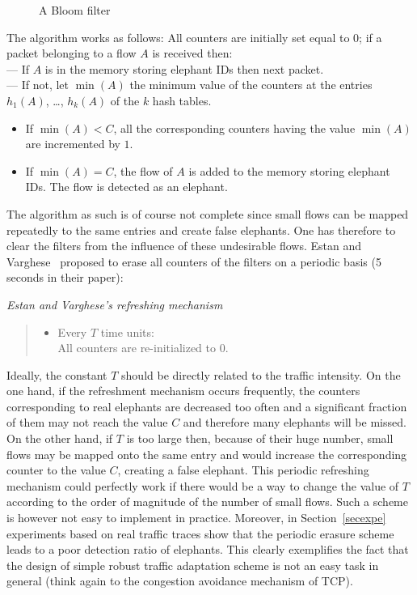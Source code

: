 \documentclass{amsart}
\begin{document}
\begin{figure}[htbp]
\caption{A Bloom filter \label{filter}}
\end{figure}
The algorithm works as follows: All counters are initially set equal to $0$;  if a packet belonging to a flow $A$ is received then:\\
\noindent
--- If $A$ is in the memory storing elephant IDs then next packet.\\
\noindent
--- If not, let $\min(A)$ the minimum  value of the counters at the entries $h_1(A)$,
  \ldots, $h_k(A)$ of the $k$ hash tables. 
\begin{itemize}
\item  If $\min(A)<C$, all the corresponding counters having the value $\min(A)$ are incremented  by $1$.
\item  If  $\min(A)=C$, the flow of $A$ is added to the memory storing elephant IDs. The
  flow is detected as  an elephant.  
\end{itemize}
The algorithm as such is of course not complete since  small flows can be mapped repeatedly
to the same entries and create false elephants. One has therefore to clear the filters
from the influence of these undesirable flows. Estan  and Varghese~\cite{Varghese}
proposed to erase all counters of the filters on a periodic basis (5 seconds in their
paper):

\bigskip
\noindent
{\em Estan and Varghese's refreshing mechanism}
\begin{quote}
\begin{itemize}
\item  Every $T$ time units:\\
All counters are re-initialized to $0$. 
\end{itemize}
\end{quote}
Ideally, the constant $T$ should be directly related to the traffic
intensity.  On the  one hand, if
the refreshment mechanism occurs frequently, the counters corresponding to real elephants
are decreased too often and a significant fraction of them may not reach the
value $C$ and therefore many elephants will be missed. On the other hand, if $T$ is too large then,
because of their huge number, small flows may be mapped onto the same
entry and would increase the corresponding counter to the value $C$, creating a false
elephant. This periodic refreshing mechanism could perfectly work if there would be a way to change the
value of $T$ according to the order of magnitude of the number of small flows. Such a
scheme is however not easy to implement in practice. Moreover, in  Section~\ref{secexpe} experiments based on real traffic traces show that the periodic erasure scheme leads to a poor detection ratio of elephants.  This clearly exemplifies the fact that   the design of simple robust traffic adaptation scheme is not
an easy task in general (think again to the congestion avoidance mechanism of TCP). 
\end{document}
